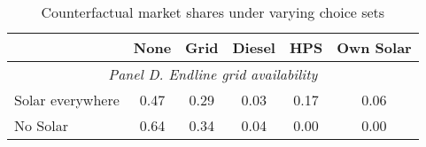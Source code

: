 \begin{table}[htbp]\centering
\caption{Counterfactual market shares under varying choice sets\label{tab:counterfactual}}
\begin{tabular}{l*{5}{c}}
\toprule
            &        None&        Grid&      Diesel&         HPS&   Own Solar\\
\midrule

\multicolumn{6}{c}{\emph{Panel D. Endline grid availability}}\\
Solar everywhere&      \cellcolor{yellow}  0.47&        0.29&        0.03&     \cellcolor{yellow}   0.17&   \cellcolor{yellow}     0.06\\
No Solar    &     \cellcolor{yellow}   0.64&        0.34&        0.04&        \cellcolor{yellow}0.00&     \cellcolor{yellow}   0.00\\

\bottomrule
\end{tabular}
\end{table}
